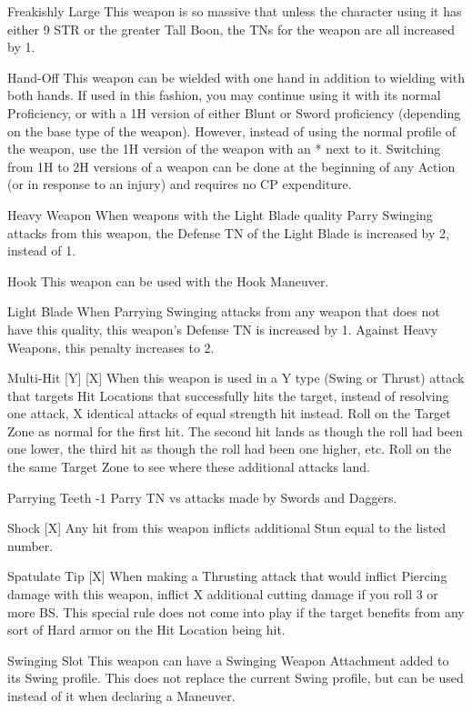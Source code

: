 \documentclass[oneside,11pt,english]{book}
\begin{document}
Freakishly Large This weapon is so massive that unless the character using it has either 9 STR or the greater Tall Boon, the TNs for the weapon are all increased by 1.

Hand-Off This weapon can be wielded with one hand in addition to wielding with both hands. If used in this fashion, you may continue using it with its normal Proficiency, or with a 1H version of either Blunt or Sword proficiency (depending on the base type of the weapon). However, instead of using the normal profile of the weapon, use the 1H version of the weapon with an * next to it. Switching from 1H to 2H versions of a weapon can be done at the beginning of any Action (or in response to an injury) and requires no CP expenditure.

Heavy Weapon When weapons with the Light Blade quality Parry Swinging attacks from this weapon, the Defense TN of the Light Blade is increased by 2, instead of 1.

Hook This weapon can be used with the Hook Maneuver.

Light Blade When Parrying Swinging attacks from any weapon that does not have this quality, this weapon’s Defense TN is increased by 1. Against Heavy Weapons, this penalty increases to 2.

Multi-Hit [Y] [X] When this weapon is used in a Y type (Swing or Thrust) attack that targets Hit Locations that successfully hits the target, instead of resolving one attack, X identical attacks of equal strength hit instead. Roll on the Target Zone as normal for the first hit. The second hit lands as though the roll had been one lower, the third hit as though the roll had been one higher, etc. Roll on the the same Target Zone to see where these additional attacks land. 

Parrying Teeth -1 Parry TN vs attacks made by Swords and Daggers.

Shock [X] Any hit from this weapon inflicts additional Stun equal to the listed number.

Spatulate Tip [X] When making a Thrusting attack that would inflict Piercing damage with this weapon, inflict X additional cutting damage if you roll 3 or more BS. This special rule does not come into play if the target benefits from any sort of Hard armor on the Hit Location being hit.

Swinging Slot This weapon can have a Swinging Weapon Attachment added to its Swing profile. This does not replace the current Swing profile, but can be used instead of it when declaring a Maneuver.
\end{document}
